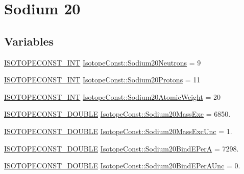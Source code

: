 \hypertarget{group___isotope_const-_sodium-_na20}{}\section{Sodium 20}
\label{group___isotope_const-_sodium-_na20}
\subsection*{Variables}
\begin{DoxyCompactItemize}
\item 
\mbox{\hyperlink{group___isotope_const-_macros_ga5f18360b3e99483a35c32d789e62621c}{I\+S\+O\+T\+O\+P\+E\+C\+O\+N\+S\+T\+\_\+\+I\+NT}} \mbox{\hyperlink{group___isotope_const-_sodium-_na20_ga029602697a52c4b5002a53367e10a328}{Isotope\+Const\+::\+Sodium20\+Neutrons}} = 9
\item 
\mbox{\hyperlink{group___isotope_const-_macros_ga5f18360b3e99483a35c32d789e62621c}{I\+S\+O\+T\+O\+P\+E\+C\+O\+N\+S\+T\+\_\+\+I\+NT}} \mbox{\hyperlink{group___isotope_const-_sodium-_na20_gae672b08ae1d212f5d08b14a16b7ee3a6}{Isotope\+Const\+::\+Sodium20\+Protons}} = 11
\item 
\mbox{\hyperlink{group___isotope_const-_macros_ga5f18360b3e99483a35c32d789e62621c}{I\+S\+O\+T\+O\+P\+E\+C\+O\+N\+S\+T\+\_\+\+I\+NT}} \mbox{\hyperlink{group___isotope_const-_sodium-_na20_ga8a81d2b60aa5c43436d82ad48a7208cc}{Isotope\+Const\+::\+Sodium20\+Atomic\+Weight}} = 20
\item 
\mbox{\hyperlink{group___isotope_const-_macros_ga8f45a7272ce02c0b4c65c44636ed719a}{I\+S\+O\+T\+O\+P\+E\+C\+O\+N\+S\+T\+\_\+\+D\+O\+U\+B\+LE}} \mbox{\hyperlink{group___isotope_const-_sodium-_na20_ga94b3c7c96bc3bc46f89ce0e5c9261b66}{Isotope\+Const\+::\+Sodium20\+Mass\+Exc}} = 6850.
\item 
\mbox{\hyperlink{group___isotope_const-_macros_ga8f45a7272ce02c0b4c65c44636ed719a}{I\+S\+O\+T\+O\+P\+E\+C\+O\+N\+S\+T\+\_\+\+D\+O\+U\+B\+LE}} \mbox{\hyperlink{group___isotope_const-_sodium-_na20_ga2cbce6a5142b051b291613db07398d44}{Isotope\+Const\+::\+Sodium20\+Mass\+Exc\+Unc}} = 1.
\item 
\mbox{\hyperlink{group___isotope_const-_macros_ga8f45a7272ce02c0b4c65c44636ed719a}{I\+S\+O\+T\+O\+P\+E\+C\+O\+N\+S\+T\+\_\+\+D\+O\+U\+B\+LE}} \mbox{\hyperlink{group___isotope_const-_sodium-_na20_gab38ada6a85ceca537b1fb62dc8799309}{Isotope\+Const\+::\+Sodium20\+Bind\+E\+PerA}} = 7298.
\item 
\mbox{\hyperlink{group___isotope_const-_macros_ga8f45a7272ce02c0b4c65c44636ed719a}{I\+S\+O\+T\+O\+P\+E\+C\+O\+N\+S\+T\+\_\+\+D\+O\+U\+B\+LE}} \mbox{\hyperlink{group___isotope_const-_sodium-_na20_ga8916150a1afada20c9a2f9dbe0757c50}{Isotope\+Const\+::\+Sodium20\+Bind\+E\+Per\+A\+Unc}} = 0.

\end{DoxyCompactItemize}
